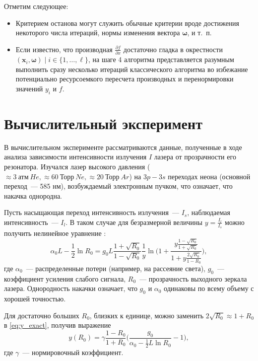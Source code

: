 \documentclass[11pt,a4paper]{article}
\newcommand{\bomega}{\boldsymbol{\omega}}
\begin{document}
Отметим следующее:
\begin{itemize}
  \item Критерием останова могут служить обычные критерии вроде достижения некоторого
    числа итераций, нормы изменения вектора $\bomega$, и т.~п.
  \item Если известно, что производная $\frac{\partial f}{\partial x}$ достаточно гладка
	в окрестности $(\mathbf{x}_i, \bomega) \mid i \in \{ 1, \dots, \ell \}$, на шаге
	4 алгоритма представляется разумным выполнить сразу несколько итераций
	классического алгоритма во избежание потенциально ресурсоемкого пересчета производных и
	перенормировки значений $y_i$ и $f$.
\end{itemize}

\section{Вычислительный эксперимент}

В вычислительном эксперименте рассматриваются данные, полученные в ходе анализа
зависимости интенсивности излучения $I$ лазера от прозрачности его резонатора.
Изучался лазер высокого давления ($\approx 3\ \text{атм}\ He, \approx 60\ \text{Торр}\ Ne, \approx 20\ \text{Торр}\ Ar$) на
$3p-3s$ переходах неона (основной переход~--- 585 нм), возбуждаемый электронным пучком,
что означает, что накачка однородна.

Пусть насыщающая переход интенсивность излучения~--- $I_s$, наблюдаемая интенсивность~---
$I_l$. В таком случае для безразмерной величины $y = \frac{I_l}{I_s}$ можно получить 
нелинейное уравнение \cite{...}:
\begin{equation}
  \alpha_0 L - \frac{1}{2} \ln R_0 = g_0 L \frac{1 + \sqrt{R_0}}{1 - \sqrt{R_0}} \frac{1}{y} \ln \Big( 1 + \frac{y \frac{1 - \sqrt{R_0}}{1 + \sqrt{R_0}}}{1 + y \frac{2 \sqrt{R_0}}{1 - R_0}} \Big),
  \label{eq:y_exact}
\end{equation}
где $\alpha_0$~--- распределенные потери (например, на рассеяние света),
$g_0$~--- коэффициент усиления слабого сигнала, $R_0$~--- прозрачность выходного
зеркала лазера. Однородность накачки означает, что $g_0$ и $\alpha_0$ одинаковы по
всему объему с хорошей точностью.

Для достаточно больших $R_0$, близких к единице, можно заменить
$2 \sqrt{R_0} \approx 1 + R_0$ в \eqref{eq:y_exact}, получив выражение
\begin{equation}
  y(R_0) = \gamma \frac{1 - R_0}{1 + R_0} \Big(\frac{g_0}{\alpha_0 - \frac{1}{2} L \ln R_0} - 1\Big),
\end{equation}
где $\gamma$~--- нормировочный коэффициент.
\end{document}
